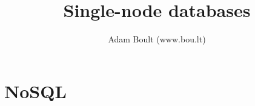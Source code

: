 \documentclass[oneside]{book}
\begin{document}
\author{Adam Boult (www.bou.lt)}
\title{Single-node databases}
\maketitle

\setcounter{tocdepth}{0}
\tableofcontents



\part{NoSQL}

\end{document}
